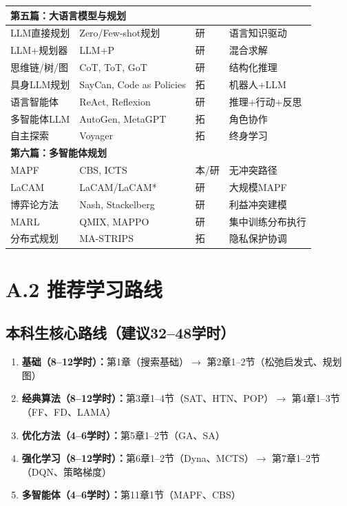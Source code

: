 \begin{longtable}{p{3.5cm}p{4cm}p{1.2cm}p{4.5cm}}
\multicolumn{4}{l}{\textbf{第五篇：大语言模型与规划}} \\
\midrule
LLM直接规划 & Zero/Few-shot规划 & \textcolor{gradcolor}{研} & 语言知识驱动 \\
LLM+规划器 & LLM+P & \textcolor{gradcolor}{研} & 混合求解 \\
思维链/树/图 & CoT, ToT, GoT & \textcolor{gradcolor}{研} & 结构化推理 \\
具身LLM规划 & SayCan, Code as Policies & \textcolor{selfcolor}{拓} & 机器人+LLM \\
语言智能体 & ReAct, Reflexion & \textcolor{gradcolor}{研} & 推理+行动+反思 \\
多智能体LLM & AutoGen, MetaGPT & \textcolor{selfcolor}{拓} & 角色协作 \\
自主探索 & Voyager & \textcolor{selfcolor}{拓} & 终身学习 \\
\midrule

\multicolumn{4}{l}{\textbf{第六篇：多智能体规划}} \\
\midrule
MAPF & CBS, ICTS & \textcolor{ugcolor}{本}/\textcolor{gradcolor}{研} & 无冲突路径 \\
LaCAM & LaCAM/LaCAM* & \textcolor{gradcolor}{研} & 大规模MAPF \\
博弈论方法 & Nash, Stackelberg & \textcolor{gradcolor}{研} & 利益冲突建模 \\
MARL & QMIX, MAPPO & \textcolor{gradcolor}{研} & 集中训练分布执行 \\
分布式规划 & MA-STRIPS & \textcolor{selfcolor}{拓} & 隐私保护协调 \\
\end{longtable}

\section*{A.2 推荐学习路线}

\subsection*{本科生核心路线（建议32--48学时）}

\begin{enumerate}
  \item \textbf{基础（8--12学时）：}第1章（搜索基础）$\rightarrow$ 第2章1--2节（松弛启发式、规划图）
  \item \textbf{经典算法（8--12学时）：}第3章1--4节（SAT、HTN、POP）$\rightarrow$ 第4章1--3节（FF、FD、LAMA）
  \item \textbf{优化方法（4--6学时）：}第5章1--2节（GA、SA）
  \item \textbf{强化学习（8--12学时）：}第6章1--2节（Dyna、MCTS）$\rightarrow$ 第7章1--2节（DQN、策略梯度）
  \item \textbf{多智能体（4--6学时）：}第11章1节（MAPF、CBS）
\end{enumerate}


